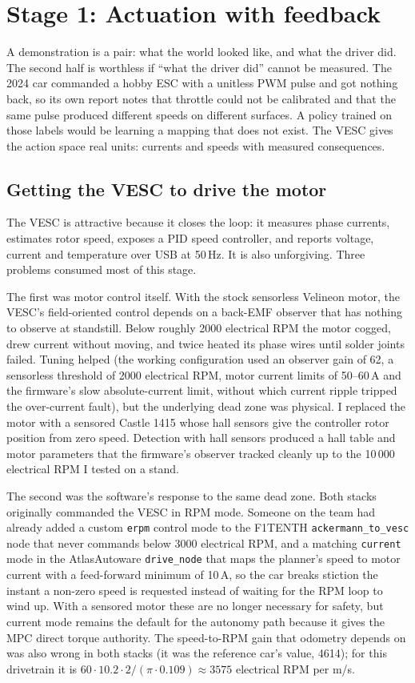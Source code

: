 \documentclass[12pt]{article}
\begin{document}
\section*{Stage 1: Actuation with feedback}

A demonstration is a pair: what the world looked like, and what the driver did. The
second half is worthless if ``what the driver did'' cannot be measured. The 2024 car
commanded a hobby ESC with a unitless PWM pulse and got nothing back, so its own report
notes that throttle could not be calibrated and that the same pulse produced different
speeds on different surfaces. A policy trained on those labels would be learning a
mapping that does not exist. The VESC gives the action space real units: currents and
speeds with measured consequences.

\subsection*{Getting the VESC to drive the motor}

The VESC is attractive because it closes the loop: it measures phase currents, estimates
rotor speed, exposes a PID speed controller, and reports voltage, current and
temperature over USB at 50\,Hz. It is also unforgiving. Three problems consumed most of
this stage.

The first was motor control itself. With the stock sensorless Velineon motor, the VESC's
field-oriented control depends on a back-EMF observer that has nothing to observe at
standstill. Below roughly 2000 electrical RPM the motor cogged, drew current without
moving, and twice heated its phase wires until solder joints failed. Tuning helped
(the working configuration used an observer gain of 62, a sensorless threshold of
2000 electrical RPM, motor current limits of 50--60\,A and the firmware's slow
absolute-current limit, without which current ripple tripped the over-current fault),
but the underlying dead zone was physical. I replaced the motor with a sensored Castle
1415 whose hall sensors give the controller rotor position from zero speed. Detection
with hall sensors produced a hall table and motor parameters that the firmware's
observer tracked cleanly up to the 10\,000 electrical RPM I tested on a stand.

The second was the software's response to the same dead zone. Both stacks originally
commanded the VESC in RPM mode. Someone on the team had already added a custom
\texttt{erpm} control mode to the F1TENTH \texttt{ackermann\_to\_vesc} node that never
commands below 3000 electrical RPM, and a matching \texttt{current} mode in the
AtlasAutoware \texttt{drive\_node} that maps the planner's speed to motor current with a
feed-forward minimum of 10\,A, so the car breaks stiction the instant a non-zero speed
is requested instead of waiting for the RPM loop to wind up. With a sensored motor these
are no longer necessary for safety, but current mode remains the default for the
autonomy path because it gives the MPC direct torque authority. The speed-to-RPM gain
that odometry depends on was also wrong in both stacks (it was the reference car's
value, 4614); for this drivetrain it is $60 \cdot 10.2 \cdot 2 / (\pi \cdot 0.109) \approx
3575$ electrical RPM per m/s.
\end{document}
